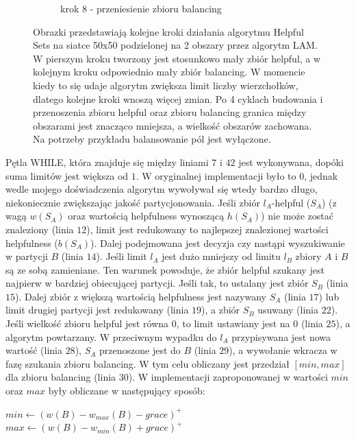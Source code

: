 \begin{figure}[h]
\begin{subfigure}{.5\textwidth}
    \caption[short]{krok 8 - przeniesienie zbioru balancing}
\end{subfigure}
\caption{Obrazki przedstawiają kolejne kroki działania algorytmu Helpful Sets na siatce 50x50 podzielonej na 2 obszary
przez algorytm LAM. W pierszym kroku tworzony jest stosunkowo mały zbiór helpful, a w kolejnym kroku odpowiednio mały zbiór balancing.
W momencie kiedy to się udaje algorytm zwiększa limit liczby wierzchołków, dlatego kolejne kroki wnoszą więcej zmian.
Po 4 cyklach budowania i przenoszenia zbioru helpful oraz zbioru balancing granica między obszarami jest znacząco mniejsza, a wielkość obszarów
zachowana. Na potrzeby przykładu balansowanie pól jest wyłączone.}
\label{im:h_steps}
\end{figure}
\FloatBarrier

Pętla WHILE, która znajduje się między liniami $7$ i $42$ jest wykonywana, dopóki suma limitów jest większa od $1$.
W oryginalnej implementacji było to $0$, jednak wedle mojego doświadczenia algorytm wywoływał się wtedy bardzo długo,
niekoniecznie zwiększając jakość partycjonowania.
Jeśli zbiór $l_A$-helpful ($S_A$) (z wagą $w(S_A)$ oraz wartością helpfulness wynoszącą $h(S_A)$) nie może zostać
znaleziony (linia $12$), limit jest redukowany to najlepszej znalezionej wartości helpfulness ($b(S_A)$).
Dalej podejmowana jest decyzja czy nastąpi wyszukiwanie w partycji $B$ (linia $14$).
Jeśli limit $l_A$ jest dużo mniejszy od limitu $l_B$ zbiory $A$ i $B$ są ze sobą zamieniane.
Ten warunek powoduje, że zbiór helpful szukany jest najpierw w bardziej obiecującej partycji.
Jeśli tak, to ustalany jest zbiór $S_B$ (linia $15$).
Dalej zbiór z większą wartością helpfulness jest nazywany $S_A$ (linia $17$) lub limit
drugiej partycji jest redukowany (linia $19$), a zbiór $S_B$ usuwany (linia $22$).
Jeśli wielkość zbioru helpful jest równa $0$, to limit ustawiany jest na $0$ (linia $25$), a algorytm powtarzany.
W przeciwnym wypadku do $l_A$ przypisywana jest nowa wartość (linia $28$), $S_A$ przenoszone jest do $B$ (linia $29$),
a wywołanie wkracza w fazę szukania zbioru balancing.
W tym celu obliczany jest przedział $[min, max]$ dla zbioru balancing (linia $30$).
W implementacji zaproponowanej w \cite{1364754} wartości $min$ oraz $max$ były obliczane w następujący sposób:
\vspace{-3mm}
\begin{pseudocode}
$min \leftarrow (w(B) - w_{max}(B) - grace)^+$
$max \leftarrow (w(B) - w_{min}(B) + grace)^+$
\end{pseudocode}
\vspace{-13mm}
